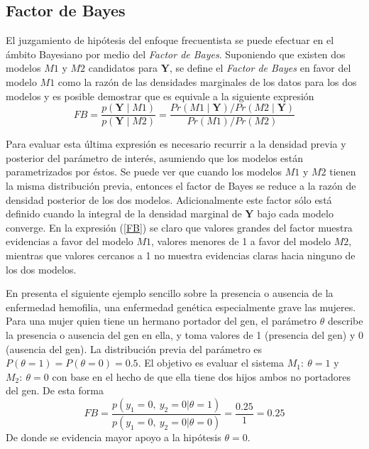 \subsection{Factor de Bayes}
El juzgamiento de hipótesis del enfoque frecuentista se puede efectuar en el ámbito Bayesiano por medio del \emph{Factor de Bayes}. Suponiendo que existen dos modelos $M1$ y $M2$ candidatos para $\mathbf{Y}$, se define el \emph{Factor de Bayes} en favor del modelo $M1$ como la razón de las densidades marginales de los datos para los dos modelos y es posible demostrar que es equivale a la siguiente expresión
\begin{equation}\label{FB}
FB=\frac{p(\mathbf{Y} \mid M1)}{p(\mathbf{Y} \mid M2)}=\frac{Pr(M1 \mid \mathbf{Y})/Pr(M2 \mid \mathbf{Y})}{Pr(M1)/Pr(M2)}
\end{equation}

Para evaluar esta última expresión es necesario recurrir a la densidad previa y posterior del parámetro de interés, asumiendo que los modelos están parametrizados por éstos. Se puede ver que cuando los modelos $M1$ y $M2$ tienen la misma distribución previa, entonces el factor de Bayes se reduce a la razón de densidad posterior de los dos modelos. Adicionalmente este factor sólo está definido cuando la integral de la densidad marginal de $\mathbf{Y}$ bajo cada modelo converge. En la expresión (\ref{FB}) se claro que valores grandes del factor muestra evidencias a favor del modelo $M1$, valores menores de 1 a favor del modelo $M2$, mientras que valores cercanos a 1 no muestra evidencias claras hacia ninguno de los dos modelos.

En  presenta el siguiente ejemplo sencillo sobre la presencia o ausencia de la enfermedad hemofilia, una enfermedad genética especialmente grave las mujeres. Para una mujer quien tiene un hermano portador del gen, el parámetro $\theta$ describe la presencia o ausencia del gen en ella, y toma valores de 1 (presencia del gen) y 0 (ausencia del gen). La distribución previa del parámetro es $P(\theta=1)=P(\theta=0)=0.5$. El objetivo es evaluar el sistema $M_1:\ \theta=1$ y $M_2:\ \theta=0$ con base en el hecho de que ella tiene dos hijos ambos no portadores del gen. De esta forma
\begin{equation*}
FB=\frac{p(y_1=0,\ y_2=0|\theta=1)}{p(y_1=0,\ y_2=0|\theta=0)}=\frac{0.25}{1}=0.25
\end{equation*}
De donde se evidencia mayor apoyo a la hipótesis $\theta=0$.

